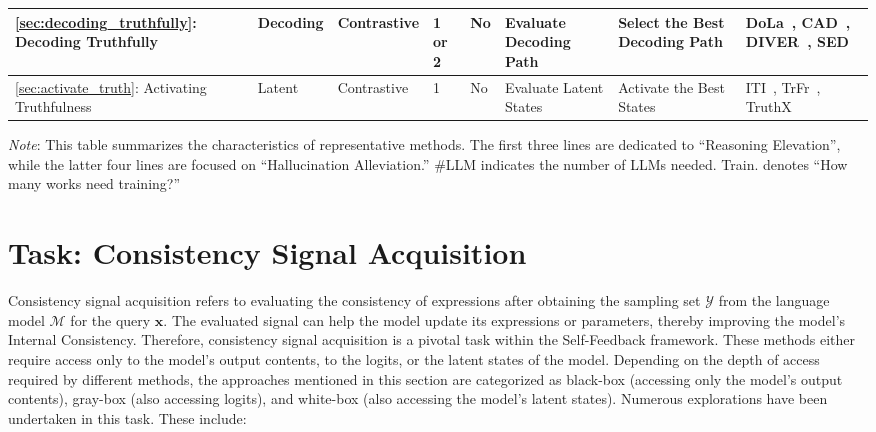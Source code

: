 \documentclass[lettersize,journal]{IEEEtran}
\begin{document}
\begin{table}[h!]
\begin{threeparttable}
\begin{tabular}{p{2.4cm}p{1.3cm}p{2.1cm}p{0.8cm}p{0.5cm}p{1.65cm}p{1.5cm}p{3.85cm}}
\midrule
\ref{sec:decoding_truthfully}: Decoding Truthfully                    & Decoding            & Contrastive                    & 1 or 2 & No            & Evaluate Decoding Path               & Select the Best Decoding Path & DoLa~\cite{DoLa_24_ICLR_MIT}, CAD~\cite{ContextAwareD_23_arXiv_Washington}, DIVER~\cite{DIVER_24_arXiv_IA}, SED~\cite{SED_24_arXiv_FDU}                      \\
\midrule
\ref{sec:activate_truth}: Activating Truthfulness                 & Latent              & Contrastive                    & 1      & No            & Evaluate Latent States              & Activate the Best States      & ITI~\cite{ITI_23_NeuIPS_Harvard}, TrFr~\cite{TrFr_24_AAAI_BUAA}, TruthX~\cite{TruthX_24_ACL_ICT}               \\
\bottomrule
\end{tabular}

\begin{tablenotes}
\footnotesize
\item \textit{Note}: This table summarizes the characteristics of representative methods. The first three lines are dedicated to ``Reasoning Elevation'', while the latter four lines are focused on ``Hallucination Alleviation.'' \#LLM indicates the number of LLMs needed. Train. denotes ``How many works need training?''
\end{tablenotes}


\end{threeparttable}
\end{table}


\section{Task: Consistency Signal Acquisition} \label{sec:consistency_signal_acquisition}


\noindent Consistency signal acquisition refers to evaluating the consistency of expressions after obtaining the sampling set $\mathcal{Y}$ from the language model $\mathcal{M}$ for the query $\boldsymbol{x}$. The evaluated signal can help the model update its expressions or parameters, thereby improving the model's Internal Consistency. Therefore, consistency signal acquisition is a pivotal task within the Self-Feedback framework. These methods either require access only to the model's output contents, to the logits, or the latent states of the model. Depending on the depth of access required by different methods, the approaches mentioned in this section are categorized as black-box (accessing only the model's output contents), gray-box (also accessing logits), and white-box (also accessing the model's latent states). Numerous explorations have been undertaken in this task. These include:
\end{document}
